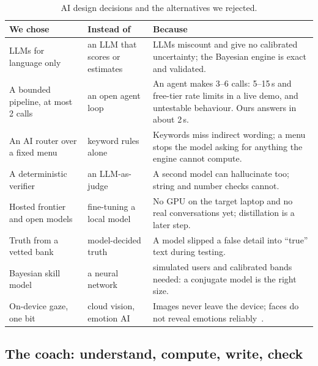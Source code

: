 \documentclass[11pt,a4paper]{article}
\begin{document}
\begin{table}[H]
\centering\small
\caption{AI design decisions and the alternatives we rejected.}
\label{tab:decisions}
\begin{tabularx}{\linewidth}{@{}>{\raggedright}p{3.3cm} >{\raggedright}p{3.4cm} >{\raggedright\arraybackslash}X@{}}
\toprule
We chose & Instead of & Because\\
\midrule
LLMs for language only & an LLM that scores or estimates & LLMs miscount and give no calibrated uncertainty; the Bayesian engine is exact and validated.\\
A bounded pipeline, at most 2 calls & an open agent loop & An agent makes 3--6 calls: 5--15\,s and free-tier rate limits in a live demo, and untestable behaviour. Ours answers in about 2\,s.\\
An AI router over a fixed menu & keyword rules alone & Keywords miss indirect wording; a menu stops the model asking for anything the engine cannot compute.\\
A deterministic verifier & an LLM-as-judge & A second model can hallucinate too; string and number checks cannot.\\
Hosted frontier and open models & fine-tuning a local model & No GPU on the target laptop and no real conversations yet; distillation is a later step.\\
Truth from a vetted bank & model-decided truth & A model slipped a false detail into ``true'' text during testing.\\
Bayesian skill model & a neural network & 500 simulated users and calibrated bands needed: a conjugate model is the right size.\\
On-device gaze, one bit & cloud vision, emotion AI & Images never leave the device; faces do not reveal emotions reliably~\cite{barrett}.\\
\bottomrule
\end{tabularx}
\end{table}

\subsection{The coach: understand, compute, write, check}
\end{document}
